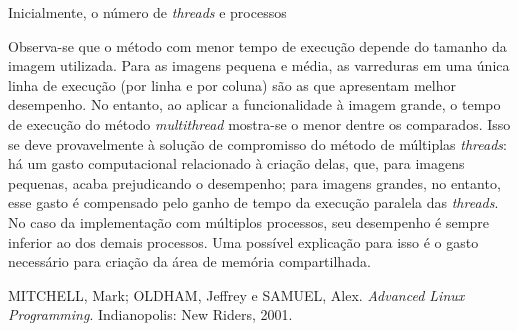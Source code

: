 \documentclass[a4paper, 10pt, conference]{ieeeconf}
\begin{document}
Inicialmente, o número de \textit{threads} e processos 

Observa-se que o método com menor tempo de execução depende do tamanho da imagem utilizada. Para as imagens pequena e média, as varreduras em uma única linha de execução (por linha e por coluna) são as que apresentam melhor desempenho. No entanto, ao aplicar a funcionalidade à imagem grande, o tempo de execução do método \textit{multithread} mostra-se o menor dentre os comparados. Isso se deve provavelmente à solução de compromisso do método de múltiplas \textit{threads}: há um gasto computacional relacionado à criação delas, que, para imagens pequenas, acaba prejudicando o desempenho; para imagens grandes, no entanto, esse gasto é compensado pelo ganho de tempo da execução paralela das \textit{threads}. No caso da implementação com múltiplos processos, seu desempenho é sempre inferior ao dos demais processos. Uma possível explicação para isso é o gasto necessário para criação da área de memória compartilhada.

\begin{thebibliography}{99}

 MITCHELL, Mark; OLDHAM, Jeffrey e SAMUEL, Alex. \textit{Advanced Linux Programming}. Indianopolis: New Riders, 2001.

\end{thebibliography}
\end{document}
